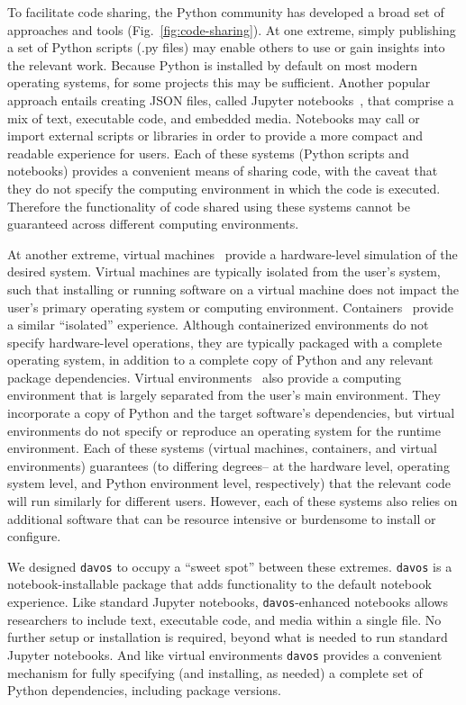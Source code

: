 \documentclass[preprint,12pt, a4paper]{elsarticle}
\begin{document}
To facilitate code sharing, the Python community has developed a broad
set of approaches and tools (Fig.~\ref{fig:code-sharing}).  At one
extreme, simply publishing a set of Python scripts (.py files) may
enable others to use or gain insights into the relevant work.  Because
Python is installed by default on most modern operating systems, for
some projects this may be sufficient.  Another popular approach
entails creating JSON files, called Jupyter
notebooks~\citep{KluyEtal16}, that comprise a mix of text, executable
code, and embedded media.  Notebooks may call or import external
scripts or libraries in order to provide a more compact and readable
experience for users.  Each of these systems (Python scripts and
notebooks) provides a convenient means of sharing code, with the
caveat that they do not specify the computing environment in which the
code is executed.  Therefore the functionality of code shared using
these systems cannot be guaranteed across different computing
environments.

At another extreme, virtual machines~\citep{Gold74, AltiEtal05,
  Rose99} provide a hardware-level simulation of the desired system.
Virtual machines are typically isolated from the user's system, such
that installing or running software on a virtual machine does not
impact the user's primary operating system or computing environment.
Containers~\citep[e.g.,][]{Merk14, KurtEtal17} provide a similar
``isolated'' experience.  Although containerized environments do not
specify hardware-level operations, they are typically packaged with a
complete operating system, in addition to a complete copy of Python
and any relevant package dependencies.  Virtual
environments~\citep[e.g.,][]{vanREtal14} also provide a computing
environment that is largely separated from the user's main
environment.  They incorporate a copy of Python and the target
software's dependencies, but virtual environments do not specify or
reproduce an operating system for the runtime environment.  Each of
these systems (virtual machines, containers, and virtual environments)
guarantees (to differing degrees-- at the hardware level, operating
system level, and Python environment level, respectively) that the
relevant code will run similarly for different users.  However, each
of these systems also relies on additional software that can be
resource intensive or burdensome to install or configure.

We designed \texttt{davos} to occupy a ``sweet spot'' between these
extremes.  \texttt{davos} is a notebook-installable package that adds
functionality to the default notebook experience.  Like standard
Jupyter notebooks, \texttt{davos}-enhanced notebooks allows
researchers to include text, executable code, and media within a
single file.  No further setup or installation is required, beyond
what is needed to run standard Jupyter notebooks.  And like virtual
environments \texttt{davos} provides a convenient mechanism for fully
specifying (and installing, as needed) a complete set of Python
dependencies, including package versions.
\end{document}
